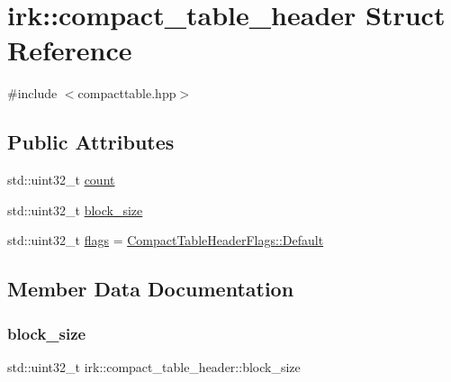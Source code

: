 \hypertarget{structirk_1_1compact__table__header}{}\section{irk\+:\+:compact\+\_\+table\+\_\+header Struct Reference}
\label{structirk_1_1compact__table__header}


{\ttfamily \#include $<$compacttable.\+hpp$>$}

\subsection*{Public Attributes}
\begin{DoxyCompactItemize}
\item 
std\+::uint32\+\_\+t \mbox{\hyperlink{structirk_1_1compact__table__header_a56cc3abb7d6c177bf6ddfbb4a1607281}{count}}
\item 
std\+::uint32\+\_\+t \mbox{\hyperlink{structirk_1_1compact__table__header_aa550cf8ef026351eaadad254f7fbed59}{block\+\_\+size}}
\item 
std\+::uint32\+\_\+t \mbox{\hyperlink{structirk_1_1compact__table__header_ae76b0ba32ba8873575f480e3148f1738}{flags}} = \mbox{\hyperlink{structirk_1_1CompactTableHeaderFlags_a18debbc227dbcb7726817a08b541e5e0}{Compact\+Table\+Header\+Flags\+::\+Default}}
\end{DoxyCompactItemize}


\subsection{Member Data Documentation}
\mbox{\label{structirk_1_1compact__table__header_aa550cf8ef026351eaadad254f7fbed59}} 
\subsubsection{\texorpdfstring{block\+\_\+size}{block\_size}}
{\footnotesize\ttfamily std\+::uint32\+\_\+t irk\+::compact\+\_\+table\+\_\+header\+::block\+\_\+size}

\mbox{\label{structirk_1_1compact__table__header_a56cc3abb7d6c177bf6ddfbb4a1607281}} 
